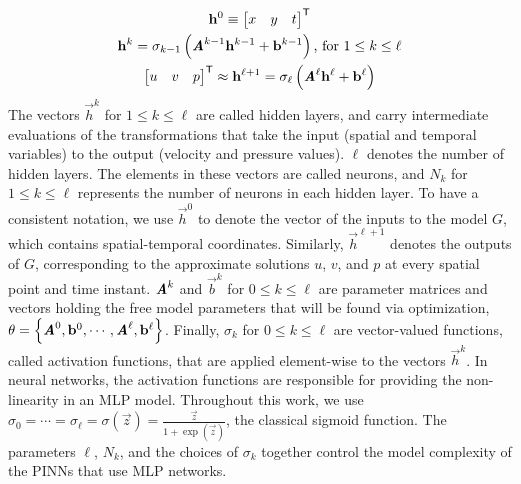 \begin{gather}\label{eq:mlp-formula}
    \mathbf{h}^0 \equiv \begin{bmatrix} x & y & t \end{bmatrix}^\mathsf{T} \\
    \mathbf{h}^k =
        \sigma_{k-1}\left(\boldsymbol{\mathit{A}}^{k-1}\mathbf{h}^{k-1}+\mathbf{b}^{k-1}\right)
        \text{, for } 1 \le k \le \ell \\
    \begin{bmatrix} u & v & p \end{bmatrix}^\mathsf{T}
        \approx
        \mathbf{h}^{\ell+1} = \sigma_\ell\left(\boldsymbol{\mathit{A}}^\ell\mathbf{h}^\ell+\mathbf{b}^\ell\right)
\end{gather}
The vectors $\vec{h}^k$ for $1 \le k \le \ell$ are called hidden layers, and carry intermediate evaluations of the transformations that take the input (spatial and temporal variables) to the output (velocity and pressure values).
$\ell$ denotes the number of hidden layers.
The elements in these vectors are called neurons, and $N_k$ for $1 \le k \le \ell$ represents the number of neurons in each hidden layer.
To have a consistent notation, we use $\vec{h}^0$ to denote the vector of the inputs to the model $G$, which contains spatial-temporal coordinates.
Similarly, $\vec{h}^{\ell+1}$ denotes the outputs of $G$, corresponding to the approximate solutions $u$, $v$, and $p$ at every spatial point and time instant. 
$\boldsymbol{\mathit{A}}^k$ and $\vec{b}^k$ for $0 \le k \le \ell$ are parameter matrices and vectors holding the free model parameters that will be found via optimization, 
$\theta = \left\{ \boldsymbol{\mathit{A}}^0, \mathbf{b}^0, \cdots, \boldsymbol{\mathit{A}}^\ell, \mathbf{b}^\ell\right\}$.
Finally, $\sigma_k$ for $0 \le k \le \ell$ are vector-valued functions, called activation functions, that are applied element-wise to the vectors $\vec{h}^k$.
In neural networks, the activation functions are responsible for providing the non-linearity in an MLP model.
Throughout this work, we use $\sigma_0 = \cdots = \sigma_\ell = \sigma(\vec{z}) = \frac{\vec{z}}{1 + \exp(\vec{z})}$, the classical sigmoid function.
The parameters $\ell$, $N_k$, and the choices of $\sigma_k$ together control the model complexity of the PINNs that use MLP networks.

